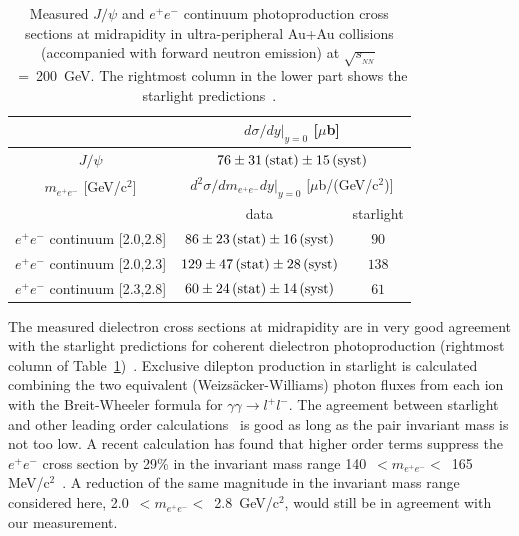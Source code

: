 \documentclass[dvipdfm]{elsart}
\newcommand{\sqrtsnn}{\sqrt{s_{_{NN}}}}
\providecommand{\jpsi}{J/\psi}
\begin{document}
\begin{table}[!htbp]
  \caption{
    \label{tab:xs_results}
Measured $\jpsi$ and $e^+ e^-$ continuum photoproduction cross sections at 
midrapidity in ultra-peripheral Au+Au collisions (accompanied with forward 
neutron emission) at $\sqrtsnn$~=~200~GeV. The rightmost column in the lower 
part shows the {\sc starlight} predictions~\cite{Nystrand:2004vn}.
  }
  \begin{center}
    \begin{tabular}{ccc}
      \noalign{\smallskip} \hline\hline
        & \multicolumn{2}{c}{$d\sigma/ dy|_{y=0}$ [$\mu$b]} 
      \\  \hline
      $J/\psi$ & \multicolumn{2}{c}{$ 76 \pm 31 \, {\rm(stat)} \pm 15 \, {\rm(syst)} $}
      \\  \noalign{\smallskip} \hline\hline 
      $m_{e^+e^-}$ [GeV/c$^2$] & \multicolumn{2}{c}{$d^2\sigma/dm_{e^+e^-} dy|_{y=0}$ [$\mu$b/(GeV/c$^2$)]}  
      \\  
                              & data                                       & {\sc starlight}
      \\  \hline
      $e^+e^-$ continuum [2.0,2.8] & $  86 \pm  23\, {\rm(stat)} \pm 16 \, {\rm(syst)} $ & $90$ \\
      $e^+e^-$ continuum [2.0,2.3] & $ 129 \pm  47 \, {\rm(stat)} \pm  28 \, {\rm(syst)}$ & $138$ \\  
      $e^+e^-$ continuum [2.3,2.8] & $  60 \pm  24 \, {\rm(stat)} \pm  14 \, {\rm(syst)} $ & $61$ \\ 
      \hline\hline 
    \end{tabular}
  \end{center}
\end{table}

The measured dielectron cross sections at midrapidity are in very good 
agreement with the {\sc starlight} predictions for coherent dielectron 
photoproduction (rightmost column of 
Table~\ref{tab:xs_results})~\cite{Nystrand:2004vn}. Exclusive dilepton 
production in {\sc starlight} is calculated combining the two equivalent 
(Weizs\"acker-Williams) photon fluxes from each ion with the Breit-Wheeler 
formula for $\gamma\gamma \rightarrow l^+l^-$. The agreement between {\sc 
starlight} and other leading order calculations~\cite{Baur:2007zz} is good as 
long as the pair invariant mass is not too low. A recent calculation has 
found that higher order terms suppress the $e^+e^-$ cross section by 29\% in 
the invariant mass range 140~$< m_{e^+e^-} <$~165 
MeV/c$^2$~\cite{Baltz:2007gs}. A reduction of the same magnitude in the 
invariant mass range considered here, 2.0~$< m_{e^+e^-} <$~2.8~GeV/c$^2$, 
would still be in agreement with our measurement.
\end{document}
